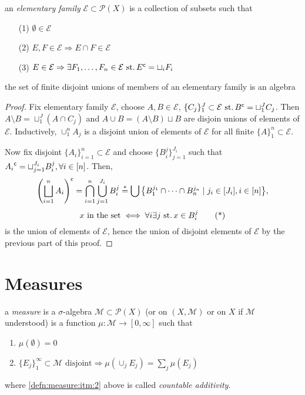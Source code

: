 \begin{defn}
  an \emph{elementary family} ${\mathcal{E}\subset \mathscr{P}(X)}$
  is a collection of subsets such that
  \begin{itemize}
  \item[(1)] ${\emptyset\in\mathcal{E}}$
  \item[(2)] ${E, F\in\mathcal{E}} \Rightarrow E\cap F\in \mathcal{E}$
  \item[(3)]
    ${E\in\mathcal{E}\Rightarrow \exists F_1,\ldots,F_n\in\mathcal{E} \operatorname{\,st.} {E}^{\mathsf{c}} = \sqcup_i F_i}$
  \end{itemize}
\end{defn}

\begin{prop}\label{prop:1.7}\label{prop:01:elemfamalg}
  the set of finite disjoint unions of members of an elementary family
  is an algebra
\end{prop}
\begin{proof}
  Fix elementary family $\mathcal{E}$, choose ${A, B\in \mathcal{E}}$,
  ${\{C_j\}_1^J\subset\mathcal{E}\operatorname{\,st.} {B}^{\mathsf{c}}=\sqcup_1^J C_j}$.
  Then ${A\setminus B=\sqcup_1^J(A\cap C_j)}$
  and ${A\cup B=(A\setminus B)\sqcup B}$
  are disjoin unions of elements of $\mathcal{E}$.
  Inductively, ${\cup_1^n A_j}$ is a disjoint union of elements of
  $\mathcal{E}$ for all finite ${\{A\}_1^n\subset\mathcal{E}}$.

  Now fix disjoint ${\{A_i\}_{i=1}^n\subset\mathcal{E}}$
  and choose ${\{B_i^j\}_{j=1}^{J_i}}$ such that
  ${{A_i}^{\mathsf{c}}=\sqcup_{j=1}^{J_i} B_i^j,\forall i\in [n]}$.
  Then,
  \[
  {\left(\bigsqcup_{i=1}^n A_i\right)}^{\mathsf{c}} =
  \bigcap_{i=1}^n\bigcup_{j=1}^{J_i} B_i^j \stackrel{*}{=}
  \bigcup\big\{B_1^{j_1}\cap\cdots\cap B_n^{j_n}\mid j_i\in [J_i], i \in [n]\big\},
  \]
  \begin{equation}
    x \text{ in the set} \iff
    \forall i\exists j\operatorname{\,st.} x\in B_i^j
    \tag{*}
  \end{equation}
  is the union of elements of $\mathcal{E}$, hence the union of
  disjoint elements of $\mathcal{E}$ by the previous part of this proof.
\end{proof}

\section{Measures}
\begin{defn}
  a \emph{measure} is a $\sigma$-algebra
  ${\mathcal{M}\subset\mathscr{P}(X)}$
  (or on ${(X, \mathcal{M})}$ or on $X$ if $\mathcal{M}$ understood)
  is a function ${\mu:\mathcal{M}\rightarrow[0,\infty]}$
  such that
  \begin{enumerate}[label=(\roman*)]
  \item ${\mu(\emptyset)=0}$
  \item\label{defn:measure:itm:2}
    ${\{E_j\}_1^\infty\subset\mathcal{M}\text{ disjoint} \Rightarrow \mu(\cup_j E_j) = \sum_j\mu(E_j)}$
  \end{enumerate}
  where \ref{defn:measure:itm:2} above is called
  \emph{countable additivity}.
\end{defn}

